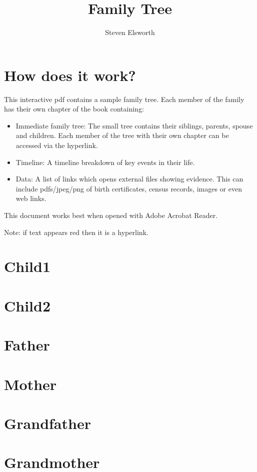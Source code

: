 \documentclass{book}
\begin{document}
\title{Family Tree}
\author{Steven Elsworth}
\maketitle

\chapter{How does it work?}
This interactive pdf contains a sample family tree. Each member of the family has their own chapter of the book containing:
\begin{itemize}
\item Immediate family tree: The small tree contains their siblings, parents, spouse and children. Each member of the tree with their own chapter can be accessed via the hyperlink.
\item Timeline: A timeline breakdown of key events in their life. 
\item Data: A list of links which opens external files showing evidence. This can include pdfs/jpeg/png of birth certificates, census records, images or even web links.
\end{itemize} 

This document works best when opened with Adobe Acrobat Reader.

\vspace{1in}
Note: if text appears \color{red} red \color{black} then it is a hyperlink.

\chapter{Child1}
\label{Child1}


\chapter{Child2}
\label{Child2}


\chapter{Father} 
\label{Father}


\chapter{Mother} 
\label{Mother}


\chapter{Grandfather} 
\label{Grandfather}


\chapter{Grandmother} 
\label{Grandmother}

\end{document}
